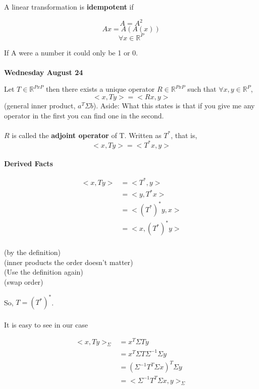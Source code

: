 \documentclass[11pt,fleqn]{book} %
\begin{document}
A linear transformation is \textbf{idempotent} if 

	$$A = A^2$$
	$$Ax = A(A(x)) $$
	$$\forall x \in \mathbb{R}^P$$


If A were a number it could only be 1 or 0. \\
\\
\textbf{Wednesday August 24}

Let $T \in \mathbb{R}^{PxP}$ then there exists a unique operator $R \in \mathbb{R}^{PxP}$ such that $\forall x, y \in \mathbb{R}^P$,\\
 $$<x, Ty> = <Rx, y> $$ (general inner product, $a^T\Sigma b$). Aside: What this states is that if you give me any operator in the first you can find one in the second.\\ 
\\
$R$ is called the \textbf{adjoint operator} of T. Written as $T^*$, that is, 
 $$<x, Ty> = <T^*x, y>$$
\\
\textbf{Derived Facts}

\begin{multicols}{2}

 \begin{align*}
	<x, Ty> &= <T^*, y>\\
	&= <y, T^*x>\\
	&= <(T^*)^*y, x>\\
	&= <x, (T^*)^*y>\\
\end{align*}

\columnbreak


		(by the definition)\\
    (inner products the order doesn't matter)\\
    (Use the definition again)\\
    (swap order)
	
  	
\end{multicols}

So, $T = (T^*)^*$. \\
\\
It is easy to see in our case 



 \begin{align*}
	<x, Ty>_\Sigma &= x^T\Sigma Ty \\
	&= x^T \Sigma T \Sigma^{-1} \Sigma y\\
	&= (\Sigma^{-1} T^T \Sigma x)^T \Sigma y\\
	&= <\Sigma^{-1} T^T \Sigma x, y>_\Sigma\\
\end{align*}
\end{document}
